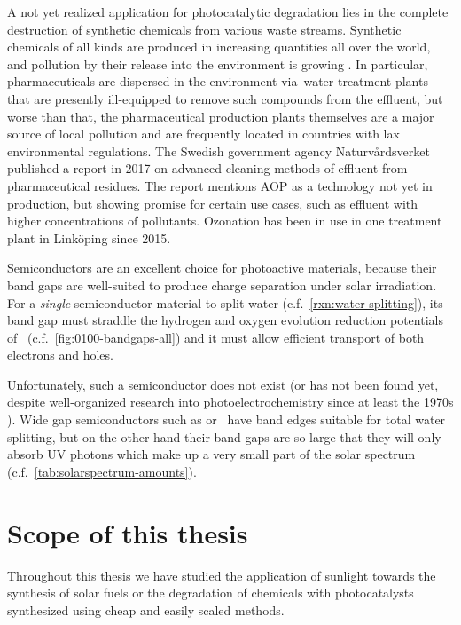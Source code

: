 \documentclass[webedition,openright,titles,swedish,english]{LuaUUThesis}\usepackage[]{graphicx}\usepackage[]{xcolor}
\newcommand{\cf}{c.f.}
\newcommand{\via}{via}
\begin{document}
A not yet realized application for photocatalytic degradation lies
in the complete destruction of synthetic chemicals from various waste streams.
Synthetic chemicals of all kinds are produced in increasing quantities all over
the world, and pollution by their release into the environment is growing \cite{Bernhardt2017}.%
In particular, pharmaceuticals are dispersed in the environment \via\
water treatment plants that are presently ill-equipped to remove such compounds
from the effluent, but worse than that, the pharmaceutical production plants
themselves are a major source of local pollution and are
frequently located in countries with lax environmental regulations.
The Swedish government agency Naturvårdsverket published a report in 2017 \cite{Naturvardsverket2017}
on advanced cleaning methods of effluent from pharmaceutical residues.
The report mentions \gls{AOP} as a technology not yet in production, but showing
promise for certain use cases, such as effluent with higher concentrations of pollutants.
Ozonation has been in use in one treatment plant in Linköping since 2015.

Semiconductors are an excellent choice for photoactive materials, because their
band gaps are well-suited to produce charge separation under solar irradiation.
For a \emph{single} semiconductor material to split water (\cf\ \cref{rxn:water-splitting}),
its band gap must straddle the hydrogen and oxygen evolution reduction potentials
of \water\ (\cf\ \cref{fig:0100-bandgaps-all}) and it must allow efficient transport
of both electrons and holes.

Unfortunately, such a semiconductor does not exist (or has not been found yet, despite
well-organized research into photoelectrochemistry since at least the 1970s \cite{Maeda2011}).
Wide gap semiconductors such as \ch{TiO2} or \ZnO\ have band edges suitable
for total water splitting, but on the other hand their band gaps are so large
that they will only absorb \gls{UV} photons which make up a very small part
of the solar spectrum (\cf\ \cref{tab:solarspectrum-amounts}).



\section{Scope of this thesis}
\label{intro:scope-thesis}

Throughout this thesis we have studied the
application of sunlight towards the synthesis of solar fuels or
the degradation of chemicals
with photocatalysts synthesized using cheap and easily scaled methods.
\end{document}
